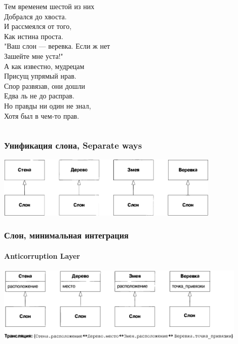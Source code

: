 \documentclass[xetex,mathserif,serif]{beamer}
\begin{document}
\begin{frame}
\begin{ssmall}
\begin{columns}
\begin{column}{0.33\textwidth}
					Тем временем шестой из них \\
					Добрался до хвоста. \\
					И рассмеялся от того, \\
					Как истина проста. \\
					"Ваш слон --- веревка. Если ж нет \\
					Зашейте мне уста!" \\
					\vspace{5mm}
					А как известно, мудрецам \\
					Присущ упрямый нрав. \\
					Спор развязав, они дошли \\
					Едва ль не до расправ. \\
					Но правды ни один не знал, \\
					Хотя был в чем-то прав.
				\end{column}
			\end{columns}
		\end{ssmall}
	\end{frame}

	\begin{frame}
		\frametitle{Унификация слона, Separate ways}
		\begin{center}
			\includegraphics[width=0.8\textwidth]{elephantSeparateWays.png}
		\end{center}
	\end{frame}

	\begin{frame}
		\frametitle{Слон, минимальная интеграция}
		\framesubtitle{Anticorruption Layer}
		\begin{center}
			\includegraphics[width=0.9\textwidth]{elephantAnticorruptionLayer.png}
		\end{center}
	\end{frame}
\end{document}
